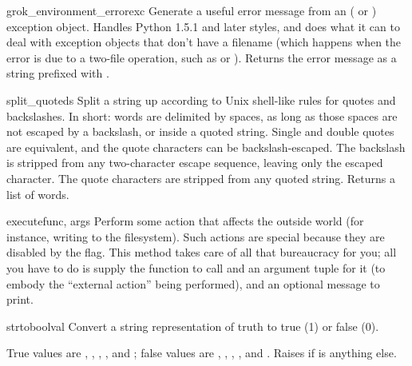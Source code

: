 \documentclass{manual}
\begin{document}
\begin{funcdesc}{grok_environment_error}{exc}
Generate a useful error message from an  
( or ) exception object.  
Handles Python 1.5.1 and later styles, and does what it can to deal with 
exception objects that don't have a filename (which happens when the error 
is due to a two-file operation, such as  or 
).  Returns the error message as a string prefixed 
with .
\end{funcdesc}

\begin{funcdesc}{split_quoted}{s}
Split a string up according to Unix shell-like rules for quotes and
backslashes.  In short: words are delimited by spaces, as long as those
spaces are not escaped by a backslash, or inside a quoted string.
Single and double quotes are equivalent, and the quote characters can
be backslash-escaped.  The backslash is stripped from any two-character
escape sequence, leaving only the escaped character.  The quote
characters are stripped from any quoted string.  Returns a list of
words.
\end{funcdesc}

\begin{funcdesc}{execute}{func, args}
Perform some action that affects the outside world (for instance,
writing to the filesystem).  Such actions are special because they
are disabled by the  flag.  This method takes 
care of all that bureaucracy for you; all you have to do is supply the
function to call and an argument tuple for it (to embody the
``external action'' being performed), and an optional message to
print.
\end{funcdesc}

\begin{funcdesc}{strtobool}{val}
Convert a string representation of truth to true (1) or false (0).

True values are , , , ,  
and ; false values are , , , , 
 and .  Raises  if  
is anything else.
\end{funcdesc}
\end{document}
